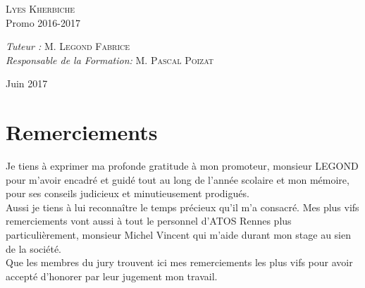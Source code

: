 \documentclass[12pt, a4paper, openany]{report}
\begin{document}
\begin{titlepage}
\begin{sffamily}
\begin{center}
    \begin{minipage}{0.4\textwidth}
      \begin{flushleft} \large
         \textsc{Lyes Kherbiche}\\
        Promo 2016-2017\\
      \end{flushleft}
    \end{minipage}
    \begin{minipage}{0.4\textwidth}
      \begin{flushright} \large
        \emph{Tuteur :}  \textsc{M. Legond Fabrice}\\
        \emph{Responsable de la Formation:} \textsc{M. Pascal Poizat}
      \end{flushright}
    \end{minipage}

    \vfill

    {\large Juin 2017}

  \end{center}
  \end{sffamily}      
      
      
      
        
  \end{titlepage}
\makeatother



\chapter*{Remerciements}

  Je tiens à exprimer ma profonde gratitude à mon promoteur, monsieur LEGOND pour m'avoir encadré et guidé tout au long de l'année scolaire et mon mémoire, pour ses conseils judicieux et minutieusement prodigués.\\
  
  Aussi je tiens à lui reconnaître le temps précieux qu’il m'a consacré. Mes plus vifs remerciements vont aussi à tout le personnel d'ATOS Rennes plus particulièrement, monsieur Michel Vincent qui m’aide durant mon stage au sien de la société. \\
  
   Que les membres du jury trouvent ici mes remerciements les plus vifs pour avoir accepté d’honorer par leur jugement mon travail.\\
   
\end{document}
